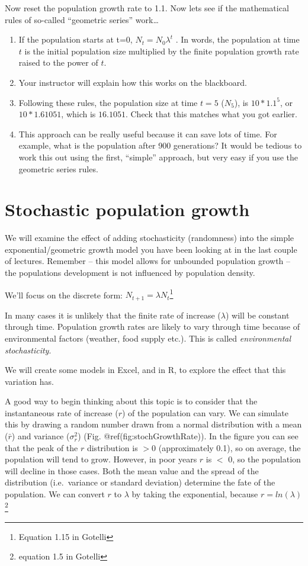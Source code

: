 \documentclass[
  a4paper]{book}
\providecommand{\tightlist}{%
  \setlength{\itemsep}{0pt}\setlength{\parskip}{0pt}}
\begin{document}
Now reset the population growth rate to 1.1. Now lets see if the
mathematical rules of so-called ``geometric series'' work\ldots{}

\begin{enumerate}
\def\labelenumi{\arabic{enumi}.}
\tightlist
\item
  If the population starts at t=0, \(N_t = N_0 \lambda^t\) . In words,
  the population at time \(t\) is the initial population size multiplied
  by the finite population growth rate raised to the power of \(t\).
\item
  Your instructor will explain how this works on the blackboard.
\item
  Following these rules, the population size at time \(t=5\) (\(N_5\)),
  is \(10 * 1.1^5\), or \(10* 1.61051\), which is \(16.1051\). Check
  that this matches what you got earlier.
\item
  This approach can be really useful because it can save lots of time.
  For example, what is the population after 900 generations? It would be
  tedious to work this out using the first, ``simple'' approach, but
  very easy if you use the geometric series rules.
\end{enumerate}

\hypertarget{stochastic-population-growth}{%
\chapter{Stochastic population
growth}\label{stochastic-population-growth}}

We will examine the effect of adding stochasticity (randomness) into the
simple exponential/geometric growth model you have been looking at in
the last couple of lectures. Remember -- this model allows for unbounded
population growth -- the populations development is not influenced by
population density.

We'll focus on the discrete form: \(N_{t+1}=λN_t\)\footnote{Equation
  1.15 in Gotelli}

In many cases it is unlikely that the finite rate of increase (\(λ\))
will be constant through time. Population growth rates are likely to
vary through time because of environmental factors (weather, food supply
etc.). This is called \emph{environmental stochasticity}.

We will create some models in Excel, and in R, to explore the effect
that this variation has.

A good way to begin thinking about this topic is to consider that the
instantaneous rate of increase (\(r\)) of the population can vary. We
can simulate this by drawing a random number drawn from a normal
distribution with a mean (\(\bar{r}\)) and variance (\(\sigma_r^2\))
(Fig. @ref(fig:stochGrowthRate)). In the figure you can see that the
peak of the \(r\) distribution is \(>0\) (approximately 0.1), so on
average, the population will tend to grow. However, in poor years \(r\)
is \(<\) 0, so the population will decline in those cases. Both the mean
value and the spread of the distribution (i.e.~variance or standard
deviation) determine the fate of the population. We can convert \(r\) to
\(\lambda\) by taking the exponential, because
\(r = ln(\lambda)\)\footnote{equation 1.5 in Gotelli}
\end{document}
